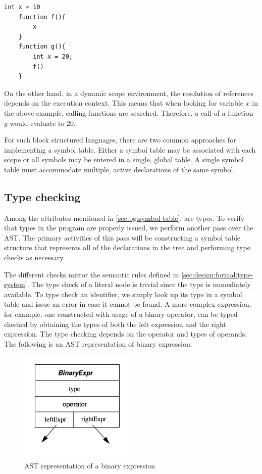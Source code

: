 \begin{lstlisting}[]
    int x = 10
    function f(){
        x
    }
    function g(){
        int x = 20;
        f()
    }
\end{lstlisting}

\par 
On the other hand, in a dynamic scope environment, the resolution of references depends on the execution context. This means that when looking for variable $x$ in the above example, calling functions are searched. Therefore, a call of a function $\textit{g}$ would evaluate to 20. 

\par 
For such block structured languages, there are two common approaches for implementing a symbol table. Either a symbol table may be associated with each scope or all symbols may be entered in a single, global table. A single symbol table must accommodate multiple, active declarations of the same symbol. \cite[p. 285]{craftingCompiler} 

\subsection{Type checking}

\par 
Among the attributes mentioned in
\cref{sec:bg:symbol-table}, are types. To verify that types in the program are properly issued, we perform another pass over the AST. The primary activities of this pass will be constructing a symbol table structure that represents all of the declarations in the tree and performing type checks as necessary. \cite[p. 300]{craftingCompiler} 
\par 
The different checks mirror the semantic rules defined in \cref{sec:design:formal:type-system}. The type check of a literal node is trivial since the type is immediately available. To type check an identifier, we simply look up its type in a symbol table and issue an error in case it cannot be found. A more complex expression, for example, one constructed with usage of a binary operator, can be typed checked by obtaining the types of both the left expression and the right expression. The type checking depends on the operator and types of operands. The following is an AST representation of binary expression: \cite[p. 329]{craftingCompiler} 

\begin{figure}[!ht]
  \centering
  \includegraphics[scale=0.8]{Pictures/AST-B-Exp.png}
  \caption{AST representation of a binary expression}
  \label{fig:ast-binary-expression}
\end{figure}


